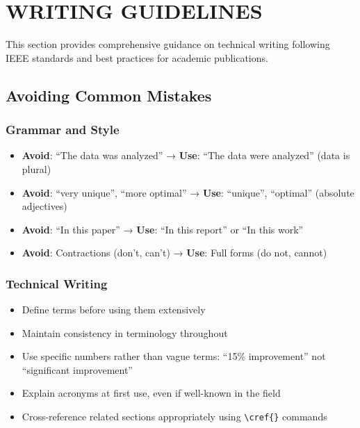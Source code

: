 \section*{WRITING GUIDELINES}

This section provides comprehensive guidance on technical writing following IEEE standards and best practices for academic publications.


\subsection*{Avoiding Common Mistakes}

\subsubsection*{Grammar and Style}

\begin{itemize}
    \item \textbf{Avoid}: ``The data was analyzed'' → \textbf{Use}: ``The data were analyzed'' (data is plural)
    \item \textbf{Avoid}: ``very unique'', ``more optimal'' → \textbf{Use}: ``unique'', ``optimal'' (absolute adjectives)
    \item \textbf{Avoid}: ``In this paper'' → \textbf{Use}: ``In this report'' or ``In this work''
    \item \textbf{Avoid}: Contractions (don't, can't) → \textbf{Use}: Full forms (do not, cannot)
\end{itemize}

\subsubsection*{Technical Writing}

\begin{itemize}
    \item Define terms before using them extensively
    \item Maintain consistency in terminology throughout
    \item Use specific numbers rather than vague terms: ``15\% improvement'' not ``significant improvement''
    \item Explain acronyms at first use, even if well-known in the field
    \item Cross-reference related sections appropriately using \texttt{\textbackslash cref\{\}} commands
\end{itemize}


